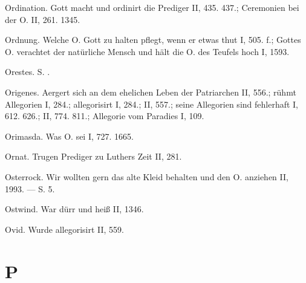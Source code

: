 Ordination. Gott macht und ordinirt die Prediger II, 435. 437.; Ceremonien bei der O. II, 261. 1345.

Ordnung. Welche O. Gott zu halten pflegt, wenn er etwas thut I, 505. f.; Gottes O. verachtet der natürliche Mensch und hält die O. des Teufels hoch I, 1593.

Orestes. S. .

Origenes. Aergert sich an dem ehelichen Leben der Patriarchen II, 556.; rühmt Allegorien I, 284.; allegorisirt I, 284.; II, 557.; seine Allegorien sind fehlerhaft I, 612. 626.; II, 774. 811.; Allegorie vom Paradies I, 109.

Orimasda. Was O. sei I, 727. 1665.

Ornat. Trugen Prediger zu Luthers Zeit II, 281.

Osterrock. Wir wollten gern das alte Kleid behalten und den O. anziehen II, 1993. — S.  5.

Ostwind. War dürr und heiß II, 1346.

Ovid. Wurde allegorisirt II, 559.

\section{P}

